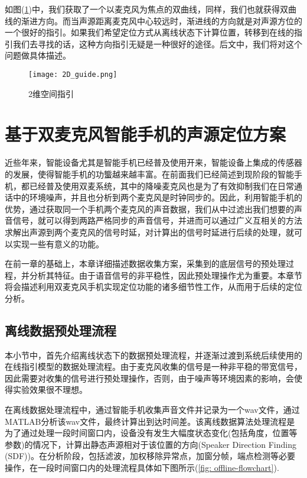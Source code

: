 \documentclass[winfonts]{njuthesis}
\begin{document}
		如图(\ref{fig: 2D_guide})中，我们获取了一个以麦克风为焦点的双曲线，同样，我们也就获得双曲线的渐进方向。而当声源距离麦克风中心较远时，渐进线的方向就是对声源方位的一个很好的指引。如果我们希望定位方式从离线状态下计算位置，转移到在线的指引我们去寻找的话，这种方向指引无疑是一种很好的途径。后文中，我们将对这个问题做具体描述。
		
		\begin{figure}[H]
			\centering
			\texttt{[image: 2D\_guide.png]} 
			\caption{2维空间指引}
			\label{fig: 2D_guide}
		\end{figure}
	
\chapter{基于双麦克风智能手机的声源定位方案}\label{chapter_work}
	
	近些年来，智能设备尤其是智能手机已经普及使用开来，智能设备上集成的传感器的发展，使得智能手机的功螚越来越丰富。在前面我们已经简述到现阶段的智能手机，都已经普及使用双麦系统，其中的降噪麦克风也是为了有效抑制我们在日常通话中的环境噪声，并且也分析到两个麦克风是时钟同步的。因此，利用智能手机的优势，通过获取同一个手机两个麦克风的声音数据，我们从中过滤出我们想要的声音信号，就可以得到两路严格同步的声音信号，并进而可以通过广义互相关的方法求解出声源到两个麦克风的信号时延，对计算出的信号时延进行后续的处理，就可以实现一些有意义的功能。
	
	在前一章的基础上，本章详细描述数据收集方案，采集到的底层信号的预处理过程，并分析其特征。由于语音信号的非平稳性，因此预处理操作尤为重要。本章节将会描述利用双麦克风手机实现定位功能的诸多细节性工作，从而用于后续的定位分析。
	
	\section{离线数据预处理流程}
	
		本小节中，首先介绍离线状态下的数据预处理流程，并逐渐过渡到系统后续使用的在线指引模型的数据处理流程。由于麦克风收集的信号是一种非平稳的带宽信号，因此需要对收集的信号进行预处理操作，否则，由于噪声等环境因素的影响，会使得实验效果很不理想。
		
		在离线数据处理流程中，通过智能手机收集声音文件并记录为一个wav文件，通过MATLAB分析该wav文件，最终计算出到达时间差。该离线数据算法处理流程是为了通过处理一段时间窗口内，设备没有发生大幅度状态变化(包括角度，位置等参数)的情况下，计算出静态声源相对于该位置的方向(Speaker Direction Finding (SDF))。在分析阶段，包括滤波，加权移除异常点，加窗分帧，端点检测等必要操作，在一段时间窗口内的处理流程具体如下图所示(\ref{fig: offline-flowchart}).
		
\end{document}
